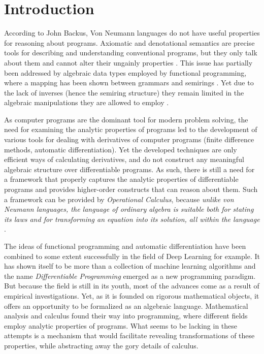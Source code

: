 \section{Introduction}

According to John Backus, Von Neumann languages do not have useful properties for reasoning about programs. Axiomatic and denotational semantics are precise tools for describing and understanding conventional programs, but they only talk about them and cannot alter their ungainly
properties \cite{backus}. This issue has partially been addressed by algebraic data types employed by functional programming, where a mapping has been shown between grammars and semirings \cite{7Trees}.
Yet due to the lack of inverses (hence the semiring structure) they remain limited in the algebraic manipulations they are allowed to employ \cite{complexCat}.

As computer programs are the dominant tool for modern problem solving, the need
for examining the analytic properties of programs led to the development of
various tools for dealing with derivatives of computer programs (finite
difference methods, automatic differentiation). Yet the developed techniques are only efficient ways of calculating derivatives, and do not construct any meaningful algebraic structure over differentiable programs. As such, there is still a need for a framework that properly captures the analytic properties of differentiable programs and provides higher-order constructs that can reason about them. Such a framework can be provided by \emph{Operational Calculus}, because \emph{unlike von Neumann languages, the language of ordinary algebra is suitable both for stating its laws and for transforming an equation into its solution, all within the language} \cite{backus}.

The ideas of functional programming and automatic differentiation have been
combined to some extent successfully in the field of Deep Learning for example.
It has shown itself to be more than a collection of machine learning algorithms
and the name \emph{Differentiable Programming} emerged as a new programming
paradigm. But because the field is still in its youth, most of the advances
come as a result of empirical investigations. Yet, as it is founded on rigorous
mathematical objects, it offers an opportunity to be formalized as an algebraic
language. Mathematical analysis and calculus found their way into programming,
where different fields employ analytic properties of programs. What seems to be
lacking in these attempts is a mechanism that would facilitate revealing
transformations of these properties, while abstracting away the gory details of
calculus. 

